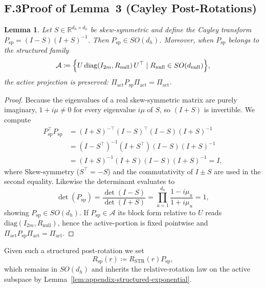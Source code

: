 \documentclass[11pt]{article}
\newcommand{\Real}{\mathbb{R}}
\newtheorem{lemma}{Lemma}
\begin{document}
\subsection*{F.3\quad Proof of Lemma~3 (Cayley Post-Rotations)}

\begin{lemma}\label{lem:appendix-cayley}
Let $S\in\Real^{d_h\times d_h}$ be skew-symmetric and define the Cayley transform
$P_{\mathrm{sp}} = (I-S)(I+S)^{-1}$.  Then $P_{\mathrm{sp}}\in SO(d_h)$.  Moreover, when
$P_{\mathrm{sp}}$ belongs to the structured family
\begin{equation}
  \mathcal{A}
  \coloneqq
  \Bigl\{ U\,\mathrm{diag}(I_{2m}, R_{\mathrm{null}})\,U^\top \mid R_{\mathrm{null}}\in SO(d_{\mathrm{null}}) \Bigr\},
  \label{eq:appendix-structured-A}
\end{equation}
the active projection is preserved: $\Pi_{\mathrm{act}} P_{\mathrm{sp}} \Pi_{\mathrm{act}} = \Pi_{\mathrm{act}}$.
\end{lemma}

\begin{proof}
Because the eigenvalues of a real skew-symmetric matrix are purely imaginary, $1+i\mu \ne 0$ for every
eigenvalue $i\mu$ of $S$, so $(I+S)$ is invertible.  We compute
\begin{align}
  P_{\mathrm{sp}}^\top P_{\mathrm{sp}}
    &= (I+S)^{-\top} (I-S)^\top (I-S) (I+S)^{-1}\\
    &= (I-S^\top)^{-1} (I+S^\top) (I-S) (I+S)^{-1}\\
    &= (I+S)^{-1} (I+S) (I-S) (I+S)^{-1} = I,
\end{align}
where Skew-symmetry ($S^\top=-S$) and the commutativity of $I\pm S$ are used in the second equality.
Likewise the determinant evaluates to
\begin{equation}
  \det(P_{\mathrm{sp}})
  = \frac{\det(I-S)}{\det(I+S)}
  = \prod_{u=1}^{d_h} \frac{1-i\mu_u}{1+i\mu_u} = 1,
\end{equation}
showing $P_{\mathrm{sp}}\in SO(d_h)$.  If $P_{\mathrm{sp}}\in\mathcal{A}$ its block form relative to $U$
reads $\mathrm{diag}(I_{2m}, R_{\mathrm{null}})$, hence the active-portion is fixed pointwise and
$\Pi_{\mathrm{act}} P_{\mathrm{sp}} \Pi_{\mathrm{act}} = \Pi_{\mathrm{act}}$.
\end{proof}

Given such a structured post-rotation we set
\begin{equation}
  R_{\mathrm{sp}}(r) \coloneqq R_{\mathrm{STR}}(r) P_{\mathrm{sp}},
  \label{eq:appendix-Rsp}
\end{equation}
which remains in $SO(d_h)$ and inherits the relative-rotation law on the active subspace by
Lemma~\ref{lem:appendix-structured-exponential}.
\end{document}
